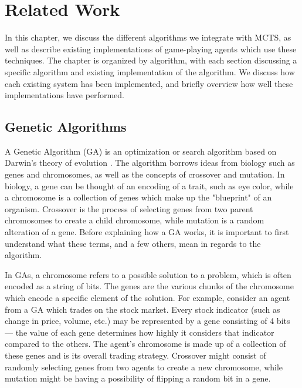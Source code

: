 %
%
\chapter{Related Work}\label{ch:relatedwork}
In this chapter, we discuss the different algorithms we integrate with MCTS, as well as describe existing implementations of game-playing agents which use these techniques.  The chapter is organized by algorithm, with each section discussing a specific algorithm and existing implementation of the algorithm.  We discuss how each existing system has been implemented, and briefly overview how well these implementations have performed.

\section{Genetic Algorithms}
A Genetic Algorithm (GA) is an optimization or search algorithm based on Darwin's theory of evolution \cite{fuzzymitchell99}.  The algorithm borrows ideas from biology such as genes and chromosomes, as well as the concepts of crossover and mutation.  In biology, a gene can be thought of an encoding of a trait, such as eye color, while a chromosome is a collection of genes which make up the "blueprint" of an organism.  Crossover is the process of selecting genes from two parent chromosomes to create a child chromosome, while mutation is a random alteration of a gene.  Before explaining how a GA works, it is important to first understand what these terms, and a few others, mean in regards to the algorithm.

In GAs, a chromosome refers to a possible solution to a problem, which is often encoded as a string of bits.  The genes are the various chunks of the chromosome which encode a specific element of the solution.  For example, consider an agent from a GA which trades on the stock market.  Every stock indicator (such as change in price, volume, etc.) may be represented by a gene consisting of 4 bits --- the value of each gene determines how highly it considers that indicator compared to the others.  The agent's chromosome is made up of a collection of these genes and is its overall trading strategy.  Crossover might consist of randomly selecting genes from two agents to create a new chromosome, while mutation might be	having a possibility of flipping a random bit in a gene.

